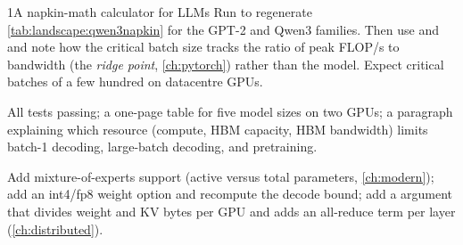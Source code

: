 \begin{labbox}{1}{A napkin-math calculator for LLMs}
Run  to regenerate \cref{tab:landscape:qwen3napkin} for the GPT-2 and
Qwen3 families. Then use  and  and note how the critical batch
size tracks the ratio of peak FLOP/s to bandwidth (the \emph{ridge point}, \cref{ch:pytorch}) rather than the
model. Expect critical batches of a few hundred on datacentre GPUs.

All tests passing; a one-page table for five model sizes on two GPUs; a paragraph explaining which
resource (compute, HBM capacity, HBM bandwidth) limits batch-1 decoding, large-batch decoding, and
pretraining.

Add mixture-of-experts support (active versus total parameters, \cref{ch:modern}); add an int4/fp8 weight
option and recompute the decode bound; add a  argument that divides weight and KV
bytes per GPU and adds an all-reduce term per layer (\cref{ch:distributed}).
\end{labbox}
